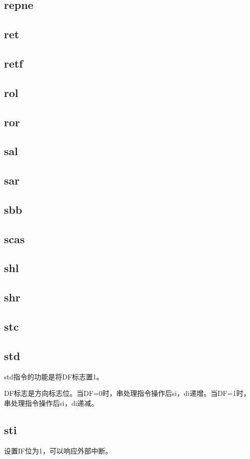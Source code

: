 \documentclass[a4paper,left=2.5cm,right=2.5cm,11pt]{article}
\begin{document}
\subsection{repne}
\subsection{ret}
\subsection{retf}
\subsection{rol}
\subsection{ror}
\subsection{sal}
\subsection{sar}
\subsection{sbb}
\subsection{scas}
\subsection{shl}
\subsection{shr}
\subsection{stc}
\subsection{std}
	std指令的功能是将DF标志置1。\par
	DF标志是方向标志位。当DF=0时，串处理指令操作后si，di递增。当DF=1时，串处理指令操作后si，di递减。

\subsection{sti}
	设置IF位为1，可以响应外部中断。
\end{document}
